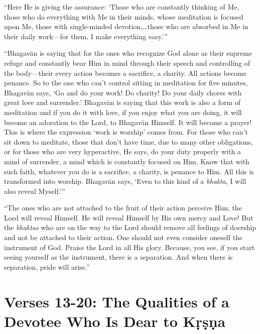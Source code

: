 \enquote{Here He is giving the assurance: \enquote{Those who are constantly thinking of Me, those who do everything with Me in their minds, whose meditation is focused upon Me, those with single-minded devotion,\ldots those who are absorbed in Me in their daily work---for them, I make everything easy.}}

\enquote{Bhagavān is saying that for the ones who recognize God alone as their supreme refuge and constantly bear Him in mind through their speech and controlling of the body---their every action becomes a sacrifice, a charity. All actions become penance. So to the one who can’t control sitting in meditation for five minutes, Bhagavān says, \enquote{Go and do your work! Do charity! Do your daily chores with great love and surrender.} Bhagavān is saying that this work is also a form of meditation and if you do it with love, if you enjoy what you are doing, it will become an adoration to the Lord, to Bhagavān Himself. It will become a prayer! This is where the expression \enquote{work is worship} comes from. For those who can’t sit down to meditate, those that don’t have time, due to many other obligations, or for those who are very hyperactive, He says, do your duty properly with a mind of surrender, a mind which is constantly focused on Him. Know that with such faith, whatever you do is a sacrifice, a charity, is penance to Him. All this is transformed into worship. Bhagavān says, \enquote{Even to this kind of a \textit{bhakta}, I will also reveal Myself.}}

\enquote{The ones who are not attached to the fruit of their action perceive Him; the Lord will reveal Himself. He will reveal Himself by His own mercy and Love! But the \textit{bhaktas} who are on the way to the Lord should remove all feelings of doership and not be attached to their action. One should not even consider oneself the instrument of God. Praise the Lord in all His glory. Because, you see, if you start seeing yourself as the instrument, there is a separation. And when there is separation, pride will arise.}


\section{Verses 13-20: The Qualities of a Devotee Who Is Dear to Kṛṣṇa}\label{sec-verses-13-20-the-qualities-of-a-devotee-who-is-dear-to-krsna}


